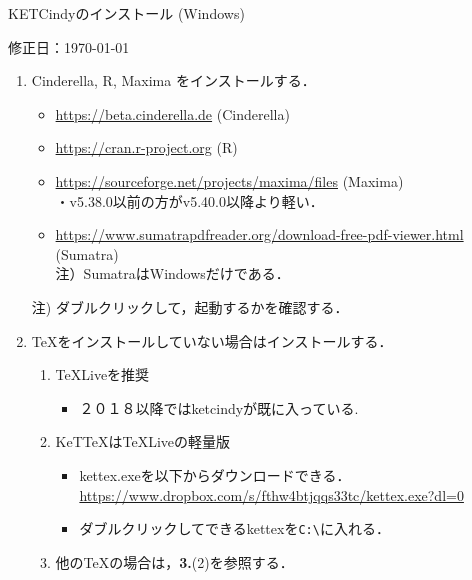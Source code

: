 \documentclass{ujarticle}
\begin{document}
\begin{center}
KETCindyのインストール (Windows)
\end{center}

\hfill 修正日：\today

\begin{enumerate}[\bf\large 1.]
\item Cinderella, R, Maxima をインストールする．
 \begin{itemize}
 \item \url{https://beta.cinderella.de}  (Cinderella)
 \item \url{https://cran.r-project.org}   (R)
 \item \url{https://sourceforge.net/projects/maxima/files}  (Maxima)\\
\hspace*{1zw}・v5.38.0以前の方がv5.40.0以降より軽い．
 \item \url{https://www.sumatrapdfreader.org/download-free-pdf-viewer.html} (Sumatra)\\ \hspace*{10mm}注）SumatraはWindowsだけである．
 \end{itemize}
 注) ダブルクリックして，起動するかを確認する．

\item TeXをインストールしていない場合はインストールする．
 \begin{enumerate}[(1)]
 \item TeXLiveを推奨
    \begin{itemize}
    \item ２０１８以降ではketcindyが既に入っている.
    \end{itemize}
 \item KeTTeXはTeXLiveの軽量版
    \begin{itemize}
    \item kettex.exeを以下からダウンロードできる．\\
    \hspace*{10mm}\url{https://www.dropbox.com/s/fthw4btjqqs33tc/kettex.exe?dl=0}
    \item ダブルクリックしてできるkettexを\verb|C:\|に入れる．
    \end{itemize}
 \item 他のTeXの場合は，{\bf 3.}(2)を参照する．
 \end{enumerate}


\end{enumerate}
\end{document}
